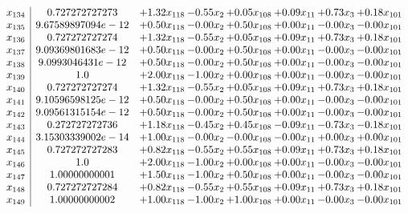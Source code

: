 \documentclass[8pt]{article}
\begin{document}
\[\begin{array}{c| c c@{\hskip 2pt} c@{\hskip 2pt} c@{\hskip 2pt} c@{\hskip 2pt} c@{\hskip 2pt} c@{\hskip 2pt} }
 x_{134}   &  0.727272727273 & +  1.32 x_{118} & -0.55 x_{2} & +  0.05 x_{108} & +  0.09 x_{11} & +  0.73 x_{3} & +  0.18 x_{101}\\
 x_{135}   &  9.67589897094e-12 & +  0.50 x_{118} & -0.00 x_{2} & +  0.50 x_{108} & +  0.00 x_{11} & -0.00 x_{3} & -0.00 x_{101}\\
 x_{136}   &  0.727272727274 & +  1.32 x_{118} & -0.55 x_{2} & +  0.05 x_{108} & +  0.09 x_{11} & +  0.73 x_{3} & +  0.18 x_{101}\\
 x_{137}   &  9.09369801683e-12 & +  0.50 x_{118} & -0.00 x_{2} & +  0.50 x_{108} & +  0.00 x_{11} & -0.00 x_{3} & -0.00 x_{101}\\
 x_{138}   &  9.0993046431e-12 & +  0.50 x_{118} & -0.00 x_{2} & +  0.50 x_{108} & +  0.00 x_{11} & -0.00 x_{3} & -0.00 x_{101}\\
 x_{139}   &  1.0 & +  2.00 x_{118} & -1.00 x_{2} & +  0.00 x_{108} & +  0.00 x_{11} & -0.00 x_{3} & -0.00 x_{101}\\
 x_{140}   &  0.727272727274 & +  1.32 x_{118} & -0.55 x_{2} & +  0.05 x_{108} & +  0.09 x_{11} & +  0.73 x_{3} & +  0.18 x_{101}\\
 x_{141}   &  9.10596598125e-12 & +  0.50 x_{118} & -0.00 x_{2} & +  0.50 x_{108} & +  0.00 x_{11} & -0.00 x_{3} & -0.00 x_{101}\\
 x_{142}   &  9.09561315154e-12 & +  0.50 x_{118} & -0.00 x_{2} & +  0.50 x_{108} & +  0.00 x_{11} & -0.00 x_{3} & -0.00 x_{101}\\
 x_{143}   &  0.272727272736 & +  1.18 x_{118} & -0.45 x_{2} & +  0.45 x_{108} & -0.09 x_{11} & -0.73 x_{3} & -0.18 x_{101}\\
 x_{144}   &  3.15303339002e-14 & +  1.00 x_{118} & -0.00 x_{2} & -0.00 x_{108} & -0.00 x_{11} & +  0.00 x_{3} & +  0.00 x_{101}\\
 x_{145}   &  0.727272727283 & +  0.82 x_{118} & -0.55 x_{2} & +  0.55 x_{108} & +  0.09 x_{11} & +  0.73 x_{3} & +  0.18 x_{101}\\
 x_{146}   &  1.0 & +  2.00 x_{118} & -1.00 x_{2} & +  0.00 x_{108} & +  0.00 x_{11} & -0.00 x_{3} & -0.00 x_{101}\\
 x_{147}   &  1.00000000001 & +  1.50 x_{118} & -1.00 x_{2} & +  0.50 x_{108} & +  0.00 x_{11} & -0.00 x_{3} & -0.00 x_{101}\\
 x_{148}   &  0.727272727284 & +  0.82 x_{118} & -0.55 x_{2} & +  0.55 x_{108} & +  0.09 x_{11} & +  0.73 x_{3} & +  0.18 x_{101}\\
 x_{149}   &  1.00000000002 & +  1.00 x_{118} & -1.00 x_{2} & +  1.00 x_{108} & +  0.00 x_{11} & -0.00 x_{3} & -0.00 x_{101}\\

\end{array}\]
\end{document}
